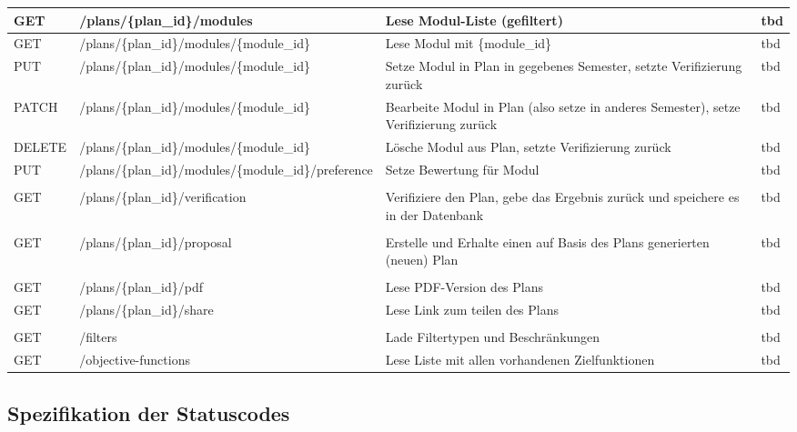 \begin{tabularx}{\textwidth}{@{} | X | X | X | X | @{}}
	GET & /plans/\{plan\_id\}/modules & Lese Modul-Liste (gefiltert) & tbd \\ \hline
	GET & /plans/\{plan\_id\}/modules/\{module\_id\} & Lese Modul mit \{module\_id\} & tbd \\ \hline
	PUT & /plans/\{plan\_id\}/modules/\{module\_id\} & Setze Modul in Plan in gegebenes Semester, setzte Verifizierung zurück & tbd \\ \hline
	PATCH & /plans/\{plan\_id\}/modules/\{module\_id\} & Bearbeite Modul in Plan (also setze in anderes Semester), setze Verifizierung zurück & tbd \\ \hline
	DELETE & /plans/\{plan\_id\}/modules/\{module\_id\} & Lösche Modul aus Plan, setzte Verifizierung zurück & tbd \\ \hline
	PUT & /plans/\{plan\_id\}/modules/\{module\_id\}/preference & Setze Bewertung für Modul & tbd \\ \hline
	& & & \\ \hline
	GET & /plans/\{plan\_id\}/verification & Verifiziere den Plan, gebe das Ergebnis zurück und speichere es in der Datenbank & tbd \\ \hline
	& & & \\ \hline
	GET & /plans/\{plan\_id\}/proposal & Erstelle und Erhalte einen auf Basis des Plans generierten (neuen) Plan & tbd \\ \hline
	& & & \\ \hline
	GET & /plans/\{plan\_id\}/pdf & Lese PDF-Version des Plans & tbd \\ \hline
	GET & /plans/\{plan\_id\}/share & Lese Link zum teilen des Plans & tbd \\ \hline
	& & & \\ \hline
	GET  & /filters & Lade Filtertypen und Beschränkungen & tbd \\ \hline
	GET & /objective-functions & Lese Liste mit allen vorhandenen Zielfunktionen & tbd \\ \hline
\end{tabularx}


\subsection{Spezifikation der Statuscodes}